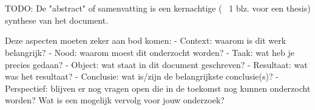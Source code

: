 
%
%

%



\chapter*{}

\color{blue}
TODO: De "abstract" of samenvatting is een kernachtige (~ 1 blz. voor een
thesis) synthese van het document.

Deze aspecten moeten zeker aan bod komen:
- Context: waarom is dit werk belangrijk?
- Nood: waarom moest dit onderzocht worden?
- Taak: wat heb je precies gedaan?
- Object: wat staat in dit document geschreven?
- Resultaat: wat was het resultaat?
- Conclusie: wat is/zijn de belangrijkste conclusie(s)?
- Perspectief: blijven er nog vragen open die in de toekomst nog kunnen
onderzocht worden? Wat is een mogelijk vervolg voor jouw onderzoek?

